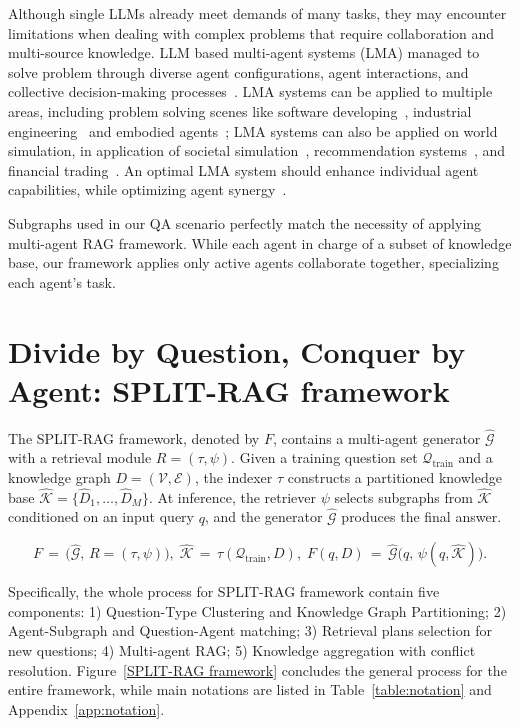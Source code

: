 \documentclass[sigconf]{acmart}
\begin{document}
Although single LLMs already meet demands of many tasks, they may encounter limitations when dealing with complex problems that require collaboration and multi-source knowledge. LLM based multi-agent systems (LMA) managed to solve problem through diverse agent configurations, agent interactions, and collective decision-making processes~\cite{li2024survey}. LMA systems can be applied to multiple areas, including problem solving scenes like software developing~\cite{dong2024self, wu2024chateda}, industrial engineering~\cite{mehta2023improving, xia2023towards} and embodied agents~\cite{brohan2023can, huang2022inner}; LMA systems can also be applied on world simulation, in application of societal simulation~\cite{gao2023s3}, recommendation systems~\cite{zhang2024agentcf}, and financial trading~\cite{guo2023gpt, zhao2023competeai}. An optimal LMA system should enhance individual agent capabilities, while optimizing agent synergy~\cite{he2024llm}.

Subgraphs used in our QA scenario perfectly match the necessity of applying multi-agent RAG framework. While each agent in charge of a subset of knowledge base, our framework applies only active agents collaborate together, specializing each agent's task.



\section{Divide by Question, Conquer by Agent: SPLIT-RAG framework}

The SPLIT-RAG framework, denoted by \(F\), contains a multi-agent generator \(\hat{\mathcal{G}}\) with a retrieval module \(R=(\tau,\psi)\).
Given a training question set \(\mathcal{Q}_{\text{train}}\) and a knowledge graph \(D=(\mathcal{V},\mathcal{E})\),
the indexer \(\tau\) constructs a partitioned knowledge base \(\hat{\mathcal{K}}=\{\hat{D}_1,\ldots,\hat{D}_M\}\).
At inference, the retriever \(\psi\) selects subgraphs from \(\hat{\mathcal{K}}\) conditioned on an input query \(q\),
and the generator \(\hat{\mathcal{G}}\) produces the final answer.


\begin{equation}
\label{eq:framework}
F \,=\, \bigl(\hat{\mathcal{G}},\, R=(\tau,\psi)\bigr),\;
\hat{\mathcal{K}} \,=\, \tau(\mathcal{Q}_{\text{train}}, D),\;
F(q,D) \,=\, \hat{\mathcal{G}}\!\bigl(q,\, \psi(q, \hat{\mathcal{K}})\bigr).
\end{equation}

Specifically, the whole process for SPLIT-RAG framework contain five components: 1) Question-Type Clustering and Knowledge Graph Partitioning; 2) Agent-Subgraph and Question-Agent matching; 3) Retrieval plans selection for new questions; 4) Multi-agent RAG; 5) Knowledge aggregation with conflict resolution. Figure~\ref{SPLIT-RAG framework} concludes the general process for the entire framework, while main notations are listed in Table~\ref{table:notation} and Appendix~\ref{app:notation}.
\end{document}
